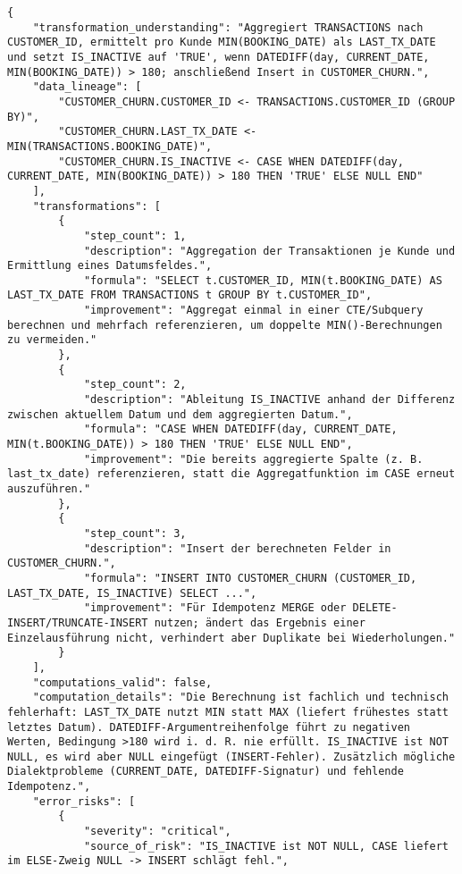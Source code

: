 \begin{lstlisting}[caption={Ausgabe: GPT-5 Anwendungsfall 7 Konsistenzdurchlauf},label={gpt_case7_prompt2}]
{
    "transformation_understanding": "Aggregiert TRANSACTIONS nach CUSTOMER_ID, ermittelt pro Kunde MIN(BOOKING_DATE) als LAST_TX_DATE und setzt IS_INACTIVE auf 'TRUE', wenn DATEDIFF(day, CURRENT_DATE, MIN(BOOKING_DATE)) > 180; anschließend Insert in CUSTOMER_CHURN.",
    "data_lineage": [
        "CUSTOMER_CHURN.CUSTOMER_ID <- TRANSACTIONS.CUSTOMER_ID (GROUP BY)",
        "CUSTOMER_CHURN.LAST_TX_DATE <- MIN(TRANSACTIONS.BOOKING_DATE)",
        "CUSTOMER_CHURN.IS_INACTIVE <- CASE WHEN DATEDIFF(day, CURRENT_DATE, MIN(BOOKING_DATE)) > 180 THEN 'TRUE' ELSE NULL END"
    ],
    "transformations": [
        {
            "step_count": 1,
            "description": "Aggregation der Transaktionen je Kunde und Ermittlung eines Datumsfeldes.",
            "formula": "SELECT t.CUSTOMER_ID, MIN(t.BOOKING_DATE) AS LAST_TX_DATE FROM TRANSACTIONS t GROUP BY t.CUSTOMER_ID",
            "improvement": "Aggregat einmal in einer CTE/Subquery berechnen und mehrfach referenzieren, um doppelte MIN()-Berechnungen zu vermeiden."
        },
        {
            "step_count": 2,
            "description": "Ableitung IS_INACTIVE anhand der Differenz zwischen aktuellem Datum und dem aggregierten Datum.",
            "formula": "CASE WHEN DATEDIFF(day, CURRENT_DATE, MIN(t.BOOKING_DATE)) > 180 THEN 'TRUE' ELSE NULL END",
            "improvement": "Die bereits aggregierte Spalte (z. B. last_tx_date) referenzieren, statt die Aggregatfunktion im CASE erneut auszuführen."
        },
        {
            "step_count": 3,
            "description": "Insert der berechneten Felder in CUSTOMER_CHURN.",
            "formula": "INSERT INTO CUSTOMER_CHURN (CUSTOMER_ID, LAST_TX_DATE, IS_INACTIVE) SELECT ...",
            "improvement": "Für Idempotenz MERGE oder DELETE-INSERT/TRUNCATE-INSERT nutzen; ändert das Ergebnis einer Einzelausführung nicht, verhindert aber Duplikate bei Wiederholungen."
        }
    ],
    "computations_valid": false,
    "computation_details": "Die Berechnung ist fachlich und technisch fehlerhaft: LAST_TX_DATE nutzt MIN statt MAX (liefert frühestes statt letztes Datum). DATEDIFF-Argumentreihenfolge führt zu negativen Werten, Bedingung >180 wird i. d. R. nie erfüllt. IS_INACTIVE ist NOT NULL, es wird aber NULL eingefügt (INSERT-Fehler). Zusätzlich mögliche Dialektprobleme (CURRENT_DATE, DATEDIFF-Signatur) und fehlende Idempotenz.",
    "error_risks": [
        {
            "severity": "critical",
            "source_of_risk": "IS_INACTIVE ist NOT NULL, CASE liefert im ELSE-Zweig NULL -> INSERT schlägt fehl.",

\end{lstlisting}
